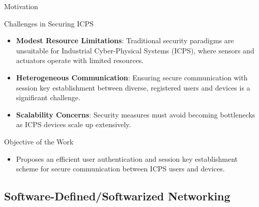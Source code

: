 \documentclass[9pt,handout]{beamer}
\begin{document}
\begin{frame}{Motivation}

\begin{block}{Challenges in Securing ICPS}
    \begin{itemize}
        \item \textbf{Modest Resource Limitations}: Traditional security paradigms are unsuitable for Industrial Cyber-Physical Systems (ICPS), where sensors and actuators operate with limited resources.
        \item \textbf{Heterogeneous Communication}: Ensuring secure communication with session key establishment between diverse, registered users and devices is a significant challenge.
        \item \textbf{Scalability Concerns}: Security measures must avoid becoming bottlenecks as ICPS devices scale up extensively.
    \end{itemize}
\end{block}

\begin{block}{Objective of the Work}
    \begin{itemize}
        \item Proposes an efficient user authentication and session key establishment scheme for secure communication between ICPS users and devices.
    \end{itemize}
\end{block}

\end{frame}
\subsection{Software-Defined/Softwarized Networking}
\end{document}
